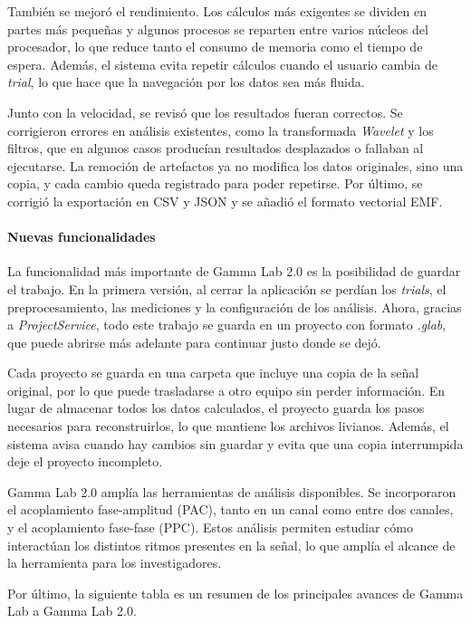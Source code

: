\documentclass[12pt,letterpaper,oneside]{article}
\begin{document}
También se mejoró el rendimiento. Los cálculos más exigentes se dividen en partes más pequeñas y algunos procesos se reparten entre varios núcleos del procesador, lo que reduce tanto el consumo de memoria como el tiempo de espera. Además, el sistema evita repetir cálculos cuando el usuario cambia de \textit{trial}, lo que hace que la navegación por los datos sea más fluida.

Junto con la velocidad, se revisó que los resultados fueran correctos. Se corrigieron errores en análisis existentes, como la transformada \textit{Wavelet} y los filtros, que en algunos casos producían resultados desplazados o fallaban al ejecutarse. La remoción de artefactos ya no modifica los datos originales, sino una copia, y cada cambio queda registrado para poder repetirse. Por último, se corrigió la exportación en CSV y JSON y se añadió el formato vectorial EMF.

\paragraph{Nuevas funcionalidades}

La funcionalidad más importante de Gamma Lab 2.0 es la posibilidad de guardar el trabajo. En la primera versión, al cerrar la aplicación se perdían los \textit{trials}, el preprocesamiento, las mediciones y la configuración de los análisis. Ahora, gracias a \textit{ProjectService}, todo este trabajo se guarda en un proyecto con formato \textit{.glab}, que puede abrirse más adelante para continuar justo donde se dejó.

Cada proyecto se guarda en una carpeta que incluye una copia de la señal original, por lo que puede trasladarse a otro equipo sin perder información. En lugar de almacenar todos los datos calculados, el proyecto guarda los pasos necesarios para reconstruirlos, lo que mantiene los archivos livianos. Además, el sistema avisa cuando hay cambios sin guardar y evita que una copia interrumpida deje el proyecto incompleto.

Gamma Lab 2.0 amplía las herramientas de análisis disponibles. Se incorporaron el acoplamiento fase-amplitud (PAC), tanto en un canal como entre dos canales, y el acoplamiento fase-fase (PPC). Estos análisis permiten estudiar cómo interactúan los distintos ritmos presentes en la señal, lo que amplía el alcance de la herramienta para los investigadores.

Por último, la siguiente tabla es un resumen de los principales avances de Gamma Lab a Gamma Lab 2.0.
\end{document}
